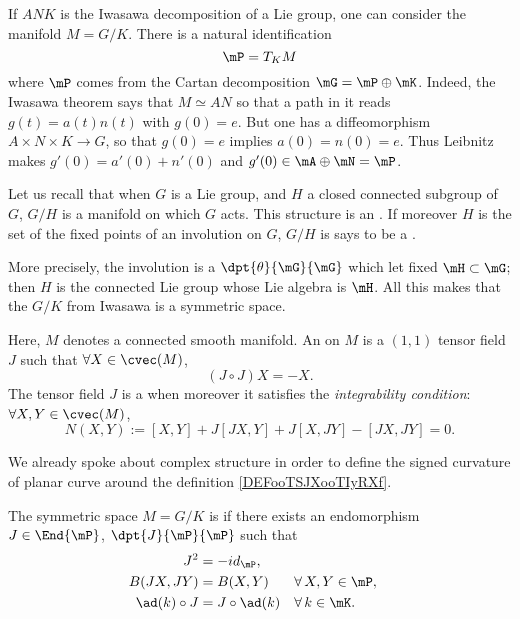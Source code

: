 If $ANK$ is the Iwasawa decomposition of a Lie group, one can consider the manifold $M=G/K$. There is a natural identification
\[
   \mP=T_KM
\]
where $\mP$ comes from the Cartan decomposition $\mG=\mP\oplus\mK$. Indeed, the Iwasawa theorem says that $M\simeq AN$ so that a path in it reads $g(t)=a(t)n(t)$ with $g(0)=e$. But one has a diffeomorphism $A\times N\times K\to G$, so that $g(0)=e$ implies $a(0)=n(0)=e$. Thus Leibnitz makes $g'(0)=a'(0)+n'(0)$ and $g'(0)\in\mA\oplus\mN=\mP$.

Let us recall that when $G$ is a Lie group, and $H$ a closed connected subgroup of $G$, $G/H$ is a manifold on which $G$ acts. This structure is an . If moreover $H$ is the set of the fixed points of an involution on $G$, $G/H$ is says to be a .

More precisely, the involution is a $\dpt{\theta}{\mG}{\mG}$ which let fixed $\mH\subset\mG$; then $H$ is the connected Lie group whose Lie algebra is $\mH$. All this makes that the $G/K$ from Iwasawa is a symmetric space.

\begin{definition}  \label{DefCLtjFtD}
    Here, $M$ denotes a connected smooth manifold. An  on $M$ is a $(1,1)$ tensor field $J$ such that $\forall X\in\cvec(M)$,
    \begin{equation}
       (J\circ J)X=-X.
    \end{equation}
    The tensor field $J$ is a  when moreover it satisfies the \emph{integrability condition}: $\forall X,Y\in\cvec(M)$,
    \begin{equation}  \label{DefComplStruct}
       N(X,Y):=[X,Y]+J[JX,Y]+J[X,JY]-[JX,JY]=0.
    \end{equation}
\end{definition}
We already spoke about complex structure in order to define the signed curvature of planar curve around the definition \ref{DEFooTSJXooTIyRXf}.

\begin{definition}		\label{DefSymHermMGKalg}
  The symmetric space $M=G/K$ is  if there exists an endomorphism $J\in\End{\mP}$, $\dpt{J}{\mP}{\mP}$ such that
\begin{subequations}  
\begin{align}  
  J^2&=-id_{\mP},                                           \label{eq:herm_1} \\
  B(JX,JY)&=B(X,Y)            && \forall\,X,Y\in\mP,    \label{eq:herm_2}\\
  \ad (k)\circ J&=J\circ\ad(k)&& \forall\,k\in\mK.      \label{eq:herm_3}
\end{align}    
\end{subequations}
\label{def:hermitien}
\end{definition}

